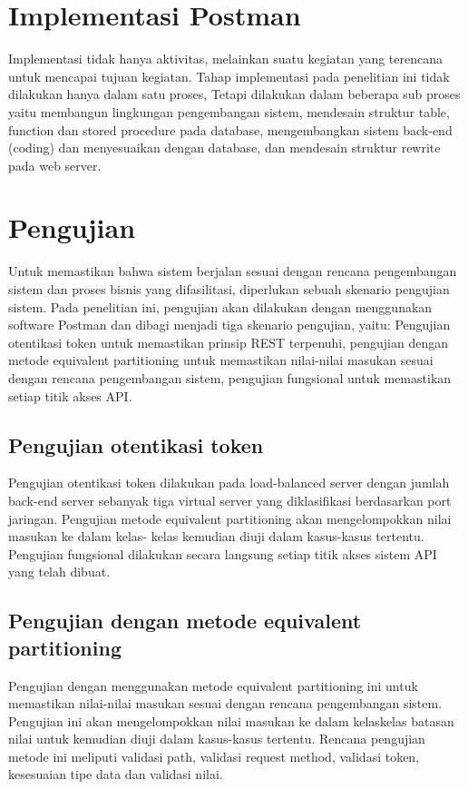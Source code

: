 \documentclass[12pt,a4paper]{article}
\begin{document}
\section{Implementasi Postman}
Implementasi tidak hanya aktivitas, melainkan suatu kegiatan yang terencana untuk mencapai
tujuan kegiatan. Tahap implementasi pada penelitian ini tidak dilakukan hanya dalam satu proses,
Tetapi dilakukan dalam beberapa sub proses yaitu membangun lingkungan pengembangan sistem, 
mendesain struktur table, function dan stored procedure pada database, mengembangkan sistem back-end (coding) 
dan menyesuaikan dengan database, dan mendesain struktur rewrite pada web server. 

\section{Pengujian}
Untuk memastikan bahwa sistem berjalan sesuai dengan rencana pengembangan sistem dan proses bisnis yang difasilitasi, diperlukan sebuah skenario pengujian sistem. Pada penelitian ini, pengujian akan dilakukan dengan menggunakan software Postman dan dibagi menjadi tiga skenario pengujian, yaitu: Pengujian otentikasi token untuk memastikan prinsip REST terpenuhi, pengujian dengan metode equivalent partitioning untuk memastikan nilai-nilai masukan sesuai dengan rencana pengembangan sistem, pengujian fungsional untuk memastikan setiap titik akses API.

\subsection{Pengujian otentikasi token}
Pengujian  otentikasi token dilakukan pada load-balanced server dengan jumlah back-end server sebanyak tiga virtual server yang diklasifikasi berdasarkan port jaringan. Pengujian  metode equivalent partitioning akan mengelompokkan nilai masukan ke dalam kelas- kelas kemudian diuji dalam kasus-kasus tertentu. Pengujian fungsional dilakukan secara langsung setiap titik akses sistem API yang telah dibuat. 


\subsection {Pengujian dengan metode equivalent partitioning}
Pengujian dengan menggunakan metode equivalent partitioning ini untuk memastikan nilai-nilai masukan sesuai dengan rencana pengembangan sistem. Pengujian ini akan mengelompokkan nilai masukan ke dalam kelaskelas batasan nilai untuk kemudian diuji dalam kasus-kasus tertentu. Rencana pengujian metode ini meliputi validasi path, validasi request method, validasi token, kesesuaian tipe data dan validasi nilai.
\end{document}
